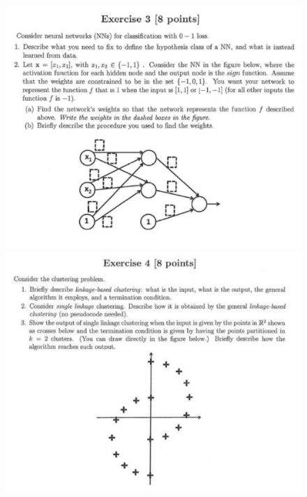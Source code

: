 \documentclass[a4paper,11pt,oneside]{book}
\begin{document}
\begin{figure}[H]
    \centering
    \begin{minipage}{0.45\textwidth}
        \includegraphics[width=\textwidth,page=7]{images/ex3_31_Jan_2023.png}
    \end{minipage}
    \hfill
    \begin{minipage}{0.45\textwidth}
        \includegraphics[width=\textwidth,page=9]{images/ex4_31_Jan_2023.png}
    \end{minipage}
\end{figure}
\clearpage
\end{document}
